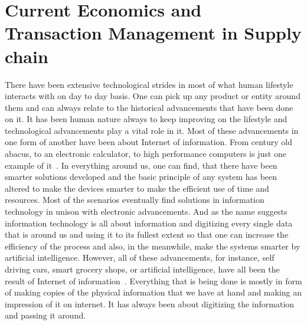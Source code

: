 \maketitle
\section{Current Economics and Transaction Management in Supply chain}

There have been extensive technological strides in most of what human
lifestyle interacts with on day to day basis. One can pick up any
product or entity around them and can always relate to the historical
advancements that have been done on it. It has been human nature
always to keep improving on the lifestyle and technological
advancements play a vital role in it. Most of these advancements in
one form of another have been about Internet of information. From
century old abacus, to an electronic calculator, to high performance
computers is just one example of it~\cite{tapscott1}. In everything
around us, one can find, that there have been smarter solutions
developed and the basic principle of any system has been altered to
make the devices smarter to make the efficient use of time and
resources. Most of the scenarios eventually find solutions in
information technology in unison with electronic advancements. And as
the name suggests information technology is all about information and
digitizing every single data that is around us and using it to its
fullest extent so that one can increase the efficiency of the process
and also, in the meanwhile, make the systems smarter by artificial
intelligence. However, all of these advancements, for instance, self
driving cars, smart grocery shops, or artificial intelligence, have
all been the result of Internet of information~\cite{tapscott1}.
Everything that is being done is mostly in form of making copies of
the physical information that we have at hand and making an impression
of it on internet. It has always been about digitizing the information
and passing it around.

